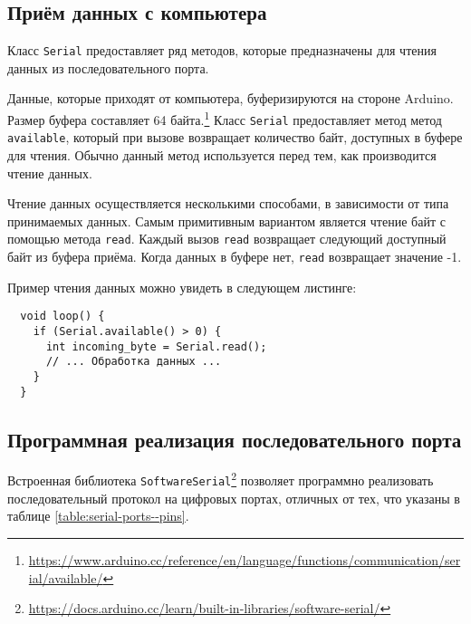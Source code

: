 \documentclass[../sparc.tex]{subfiles}
\begin{document}
\subsection{Приём данных с компьютера}

Класс \texttt{Serial} предоставляет ряд методов, которые предназначены для
чтения данных из последовательного порта.

Данные, которые приходят от компьютера, буферизируются на стороне Arduino.
Размер буфера составляет 64
байта.\footnote{\url{https://www.arduino.cc/reference/en/language/functions/communication/serial/available/}}
Класс \texttt{Serial} предоставляет метод метод \texttt{available}, который при
вызове возвращает количество байт, доступных в буфере для чтения.  Обычно данный
метод используется перед тем, как производится чтение данных.

Чтение данных осуществляется несколькими способами, в зависимости от типа
принимаемых данных.  Самым примитивным вариантом является чтение байт с помощью
метода \texttt{read}.  Каждый вызов \texttt{read} возвращает следующий доступный
байт из буфера приёма.  Когда данных в буфере нет, \texttt{read} возвращает
значение -1.


Пример чтения данных можно увидеть в следующем листинге:

\begin{verbatim}
  void loop() {
    if (Serial.available() > 0) {
      int incoming_byte = Serial.read();
      // ... Обработка данных ...
    }
  }
\end{verbatim}

\subsection{Программная реализация последовательного порта}

Встроенная библиотека
\texttt{SoftwareSerial}\footnote{\url{https://docs.arduino.cc/learn/built-in-libraries/software-serial/}}
позволяет программно реализовать последовательный протокол на цифровых портах,
отличных от тех, что указаны в таблице \ref{table:serial-ports--pins}.
\end{document}
